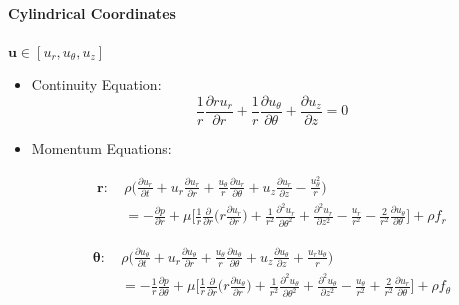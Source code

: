 \documentclass[a4paper]{article}
\begin{document}
\paragraph{Cylindrical Coordinates} $\mathbf{u} \in [u_r, u_\theta, u_z]$

\begin{itemize}
    \item Continuity Equation:
    \[\frac{1}{r}\frac{\partial ru_{r}}{\partial r} + \frac{1}{r}\frac{\partial u_{\theta}}{\partial \theta} + \frac{\partial u_{z}}{\partial z}=0\]
\end{itemize}

\begin{minipage}{.75\textwidth}
\begin{itemize}
    \item Momentum Equations:
    
    \begin{equation*}
    \begin{split}
        \boldsymbol{r:} \ & \rho \bigg(\frac{\partial u_{r}}{\partial t} + u_{r} \frac{\partial u_{r}}{\partial r} + \frac{u_{\theta}}{r}\frac{\partial u_{r}}{\partial \theta} + u_{z}\frac{\partial u_{r}}{\partial z} - \frac{u_{\theta}^{2}}{r} \bigg) \\
        & = -\frac{\partial p}{\partial r} + \mu \bigg[ \frac{1}{r}\frac{\partial}{\partial r} \bigg(r \frac{\partial u_{r}}{\partial r}\bigg) + \frac{1}{r^{2}} \frac{\partial^{2} u_{r}}{\partial \theta^{2}} + \frac{\partial^{2} u_{r}}{\partial z^{2}} - \frac{u_{r}}{r^{2}} - \frac{2}{r^{2}}\frac{\partial u_{\theta}}{\partial \theta}\bigg] + \rho f_{r}
    \end{split}
    \end{equation*}
    
    \begin{equation*}
    \begin{split}
        \boldsymbol{\theta:} \ & \rho \bigg(\frac{\partial u_{\theta}}{\partial t} + u_{r} \frac{\partial u_{\theta}}{\partial r} + \frac{u_{\theta}}{r} \frac{\partial u_{\theta}}{\partial \theta} + u_{z}\frac{\partial u_{\theta}}{\partial z} + \frac{u_{r}u_{\theta}}{r} \bigg) \\
        & = -\frac{1}{r} \frac{\partial p}{\partial \theta} + \mu \bigg[ \frac{1}{r}\frac{\partial}{\partial r} \bigg(r \frac{\partial u_{\theta}}{\partial r}\bigg) + \frac{1}{r^{2}} \frac{\partial^{2} u_{\theta}}{\partial \theta^{2}} + \frac{\partial^{2} u_{\theta}}{\partial z^{2}} - \frac{u_{\theta}}{r^{2}} + \frac{2}{r^{2}}\frac{\partial u_{r}}{\partial \theta}\bigg] + \rho f_{\theta}
    \end{split}
    \end{equation*}
    

\end{itemize}
\end{minipage}
\end{document}
